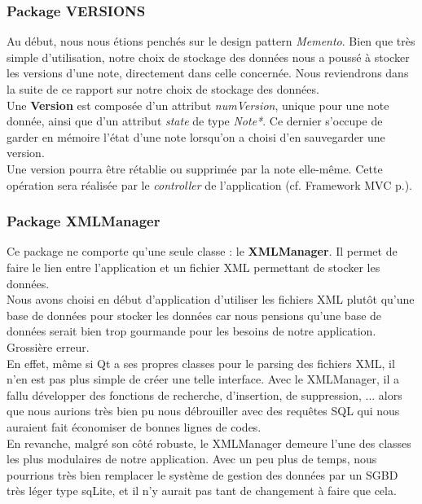 \documentclass[a4paper]{report}
\begin{document}
\subsubsection{Package VERSIONS}
Au début, nous nous étions penchés sur le design pattern \textit{Memento}. Bien que très simple d'utilisation, notre choix de stockage des données nous a poussé à stocker les versions d'une note, directement dans celle concernée. Nous reviendrons dans la suite de ce rapport sur notre choix de stockage des données.\\
Une \textbf{Version} est composée d'un attribut \textit{numVersion}, unique pour une note donnée, ainsi que d'un attribut \textit{state} de type \textit{Note*}. Ce dernier s'occupe de garder en mémoire l'état d'une note lorsqu'on a choisi d'en sauvegarder une version.\\
Une version pourra être rétablie ou supprimée par la note elle-même. Cette opération sera réalisée par le \textit{controller} de l'application (cf. Framework MVC p.\pageref{MVC}).

\subsubsection{Package XMLManager}
Ce package ne comporte qu'une seule classe : le \textbf{XMLManager}. Il permet de faire le lien entre l'application et un fichier XML permettant de stocker les données.\\
Nous avons choisi en début d'application d'utiliser les fichiers XML plutôt qu'une base de données pour stocker les données car nous pensions qu'une base de données serait bien trop gourmande pour les besoins de notre application.\\
Grossière erreur.\\
En effet, même si Qt a ses propres classes pour le parsing des fichiers XML, il n'en est pas plus simple de créer une telle interface. Avec le XMLManager, il a fallu développer des fonctions de recherche, d'insertion, de suppression, ... alors que nous aurions très bien pu nous débrouiller avec des requêtes SQL qui nous auraient fait économiser de bonnes lignes de codes.\\
En revanche, malgré son côté robuste, le XMLManager demeure l'une des classes les plus modulaires de notre application. Avec un peu plus de temps, nous pourrions très bien remplacer le système de gestion des données par un SGBD très léger type sqLite, et il n'y aurait pas tant de changement à faire que cela.
\end{document}
